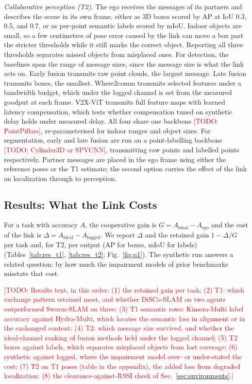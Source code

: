 \documentclass[conference]{IEEEtran}
\newcommand{\todo}[1]{\textcolor{red}{[TODO: #1]}}
\begin{document}
\emph{Collaborative perception (T2).} The ego receives the messages
of its partners and describes the scene in its own frame, either as
3D boxes scored by AP at IoU 0.3, 0.5, and 0.7, or as per-point
semantic labels scored by mIoU. Indoor objects are small, so a few
centimetres of pose error caused by the link can move a box past the
stricter thresholds while it still marks the correct object.
Reporting all three thresholds separates missed objects from
misplaced ones. For detection, the baselines span the range of
message sizes, since the message size is what the link acts on. Early
fusion transmits raw point clouds, the largest message. Late fusion
transmits boxes, the smallest. Where2comm \cite{where2comm} transmits
selected features under a bandwidth budget, which under the logged
channel is set from the measured goodput at each frame. V2X-ViT
\cite{v2xvit} transmits full feature maps with learned latency
compensation, which tests whether compensation tuned on synthetic
delay holds under measured delay. All four share one backbone
\todo{PointPillars}, re-parameterised for indoor ranges and object
sizes. For segmentation, early and late fusion are run on a
point-labelling backbone \todo{Cylinder3D or SPVCNN}, transmitting
raw points and labelled points respectively. Partner messages are
placed in the ego frame using either the reference poses or the T1
estimate; the second option carries the effect of the link on
localization through to perception.

\subsection{Results: What the Link Costs}
\label{sec:results}
For a task with accuracy $A$, the cooperative gain is
$G = A_{\mathrm{ideal}} - A_{\mathrm{ego}}$ and the cost of the link
is $\Delta = A_{\mathrm{ideal}} - A_{\mathrm{logged}}$. We report
$\Delta$ and the retained gain $1 - \Delta/G$ per task and, for T2,
per output (AP for boxes, mIoU for labels)
(Tables~\ref{tab:res_t1}, \ref{tab:res_t2}; Fig.~\ref{fig:q1}). The
synthetic run answers a related question: by how much the impairment
models of prior benchmarks misstate that cost.







\todo{Results text, in this order: (1) the retained gain per task;
(2) T1: which exchange pattern retained most, and whether DiSCo-SLAM
on two agents outperformed Swarm-SLAM on three; (3) T1 semantic rows:
Kimera-Multi label accuracy against Hydra-Multi, which locates the
semantic loss in alignment or in the exchanged content; (4) T2: which
message size survived, and whether the ideal-channel ranking of
fusion methods held under the logged channel; (5) T2 boxes against
labels, which separates misplaced objects from lost coverage; (6)
synthetic against logged, where the impairment model over- or
under-stated the cost; (7) T2 on T1 poses (table in the appendix),
the added loss from degraded localization; (8) the
clearance-against-RSSI check of Sec.~\ref{sec:environments}.}
\end{document}
